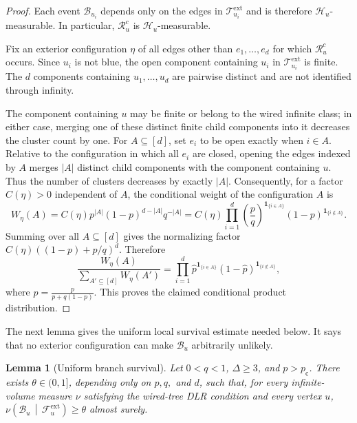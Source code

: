 \documentclass[11pt]{amsart}
\theoremstyle{plain}
\newtheorem{lemma}[theorem]{Lemma}
\theoremstyle{definition}
\theoremstyle{remark}
\newcommand{\pc}{p_{\mathsf{c}}}
\begin{document}
\begin{proof} Each event $\mathcal B_{u_i}$ depends only on the edges in $\mathcal T_{u_i}^{\mathrm{ext}}$ and is therefore $\mathcal H_u$-measurable. In particular, $\mathcal R_u^c$ is $\mathcal H_u$-measurable.

Fix an exterior configuration $\eta$ of all edges other than $e_1,\ldots,e_d$ for which $\mathcal R_u^c$ occurs. Since $u_i$ is not blue, the open component containing $u_i$ in $\mathcal T_{u_i}^{\mathrm{ext}}$ is finite. The $d$ components containing $u_1,\ldots,u_d$ are pairwise distinct and are not identified through infinity.

The component containing $u$ may be finite or belong to the wired infinite class; in either case, merging one of these distinct finite child components into it decreases the cluster count by one. For $A\subseteq[d]$, set $e_i$ to be open exactly when $i\in A$. Relative to the configuration in which all $e_i$ are closed, opening the edges indexed by $A$ merges $|A|$ distinct child components with the component containing $u$. Thus the number of clusters decreases by exactly $|A|$. Consequently, for a factor $C(\eta)>0$ independent of $A$, the conditional weight of the configuration $A$ is
\[
    W_\eta(A)
    =
    C(\eta)
    p^{|A|}
    (1-p)^{d-|A|}
    q^{-|A|}
    =
    C(\eta)
    \prod_{i=1}^d
    \left(\frac pq\right)^{\mathbf 1_{\{i\in A\}}}
    (1-p)^{\mathbf 1_{\{i\notin A\}}}.
\]
Summing over all $A\subseteq[d]$ gives the normalizing factor $C(\eta)((1-p)+p/q)^d$. Therefore
\[
    \frac{W_\eta(A)}{\sum_{A'\subseteq[d]}W_\eta(A')}
    =
    \prod_{i=1}^d
    \widehat p^{\mathbf 1_{\{i\in A\}}}
    (1-\widehat p)^{\mathbf 1_{\{i\notin A\}}},
\]
where $\widehat p =\frac{p}{p+q(1-p)}$. This proves the claimed conditional product distribution.
\end{proof}

The next lemma gives the uniform local survival estimate needed below. It says that no exterior configuration can make $\mathcal B_u$ arbitrarily unlikely.

\begin{lemma}[Uniform branch survival]
\label{lem:uniform-branch-survival}
Let $0<q<1$, $\Delta\ge3$, and $p>\pc$. There exists $\theta\in(0,1]$, depending only on $p,q,$ and $d$, such that, for every infinite-volume measure $\nu$ satisfying the wired-tree DLR condition and every vertex $u$, $\nu\left(\mathcal B_u\,\middle|\,\mathcal F_u^{\mathrm{ext}}\right)\ge\theta $ almost surely.
\end{lemma}
\end{document}
